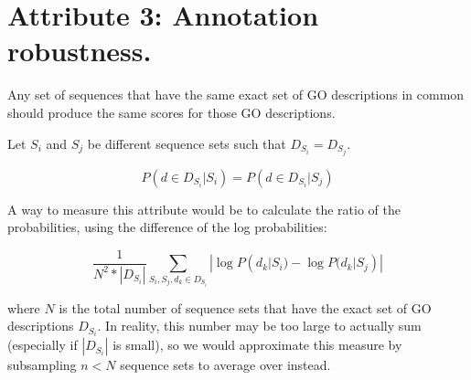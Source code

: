 \documentclass{specification}
\begin{document}

\section*{Attribute 3: Annotation robustness.}

Any set of sequences that have the same exact set of GO descriptions in common should produce the same scores for those GO descriptions.

Let $S_i$ and $S_j$ be different sequence sets such that $D_{S_i} = D_{S_j}$.

\[P(d \in D_{S_i} | S_i) = P(d \in D_{S_i} | S_j)\]

A way to measure this attribute would be to calculate the ratio of the probabilities, using the difference of the log probabilities: 

\[\frac{1}{N^{2}*|D_{S_i}|}\sum_{S_i, S_j, d_{k} \in D_{S_i}} |\log P(d_k | S_i) - \log P(d_k | S_j)|\]

where $N$ is the total number of sequence sets that have the exact set of GO descriptions $D_{S_i}$. In reality, this number may be too large to actually sum (especially if $|D_{S_i}|$ is small), so we would approximate this measure by subsampling $n < N$ sequence sets to average over instead. 
 
%
%


\end{document}
